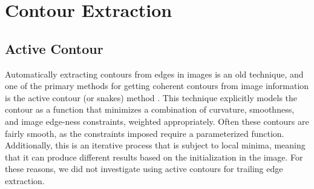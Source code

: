 

\section{Contour Extraction}

\subsection{Active Contour}

Automatically extracting contours from edges in images is an old technique, and one of the primary methods for getting coherent contours from image information is the active contour (or snakes) method \cite{amini1988using} \cite{kass1988snakes}.
This technique explicitly models the contour as a function that minimizes a combination of curvature, smoothness, and image edge-ness constraints, weighted appropriately.
Often these contours are fairly smooth, as the constraints imposed require a parameterized function.
Additionally, this is an iterative process that is subject to local minima, meaning that it can produce different results based on the initialization in the image.
For these reasons, we did not investigate using active contours for trailing edge extraction.

